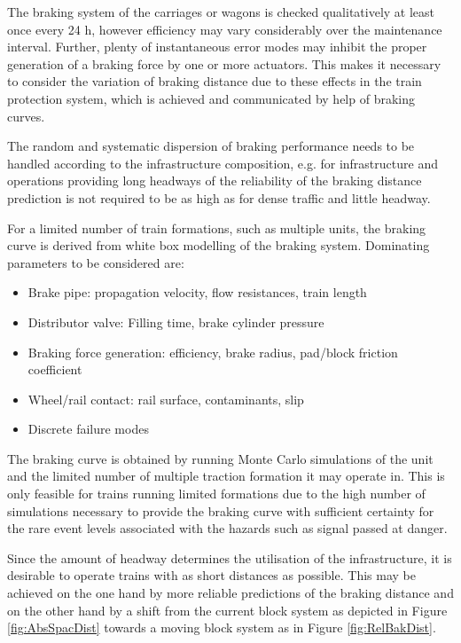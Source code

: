 \documentclass[a4paper, 12pt]{scrartcl}
\begin{document}
The braking system of the carriages or wagons is checked qualitatively at least once every 24 h, however efficiency may vary considerably over the maintenance interval. Further, plenty of instantaneous error modes may inhibit the proper generation of a braking force by one or more actuators. This makes it necessary to consider the variation of braking distance due to these effects in the train protection system, which is achieved and communicated by help of braking curves. 

The random and systematic dispersion of braking performance needs to be handled according to the infrastructure composition, e.g. for infrastructure and operations providing long headways of the reliability of the braking distance prediction is not required to be as high as for dense traffic and little headway.

For a limited number of train formations, such as multiple units, the braking curve is derived from white box modelling of the braking system. Dominating parameters to be considered are:
\begin{itemize}
	\item Brake pipe: propagation velocity, flow resistances, train length
	\item Distributor valve: Filling time, brake cylinder pressure
	\item Braking force generation: efficiency, brake radius, pad/block friction coefficient
	\item Wheel/rail contact: rail surface, contaminants, slip
 	\item Discrete failure modes \cite{tsilocpas}
\end{itemize} 
The braking curve is obtained by running Monte Carlo simulations of the unit and the limited number of multiple traction formation it may operate in. 
This is only feasible for trains running limited formations due to the high number of simulations necessary to provide the braking curve with sufficient certainty for the rare event levels associated with the hazards such as signal passed at danger.

Since the amount of headway determines the utilisation of the infrastructure, it is desirable to operate trains with as short distances as possible. This may be achieved on the one hand by more reliable predictions of the braking distance and on the other hand by a shift from the current block system as depicted in Figure \ref{fig:AbsSpacDist} towards a moving block system as in Figure \ref{fig:RelBakDist}.
\end{document}
